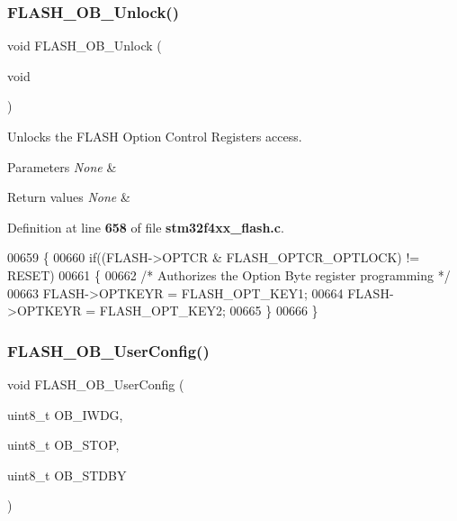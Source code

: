 \subsubsection{F\+L\+A\+S\+H\+\_\+\+O\+B\+\_\+\+Unlock()}
{\footnotesize\ttfamily void F\+L\+A\+S\+H\+\_\+\+O\+B\+\_\+\+Unlock (\begin{DoxyParamCaption}\item[{void}]{ }\end{DoxyParamCaption})}



Unlocks the F\+L\+A\+SH Option Control Registers access. 


\begin{DoxyParams}{Parameters}
{\em None} & \\
\hline
\end{DoxyParams}

\begin{DoxyRetVals}{Return values}
{\em None} & \\
\hline
\end{DoxyRetVals}


Definition at line \textbf{ 658} of file \textbf{ stm32f4xx\+\_\+flash.\+c}.


\begin{DoxyCode}
00659 \{
00660   \textcolor{keywordflow}{if}((FLASH->OPTCR & FLASH_OPTCR_OPTLOCK) != RESET)
00661   \{
00662     \textcolor{comment}{/* Authorizes the Option Byte register programming */}
00663     FLASH->OPTKEYR = FLASH_OPT_KEY1;
00664     FLASH->OPTKEYR = FLASH_OPT_KEY2;
00665   \}  
00666 \}
\end{DoxyCode}
\mbox{\label{group__FLASH__Group3_ga6b605409e4271b4cc6dfb56ed8108a1a}} 
\subsubsection{F\+L\+A\+S\+H\+\_\+\+O\+B\+\_\+\+User\+Config()}
{\footnotesize\ttfamily void F\+L\+A\+S\+H\+\_\+\+O\+B\+\_\+\+User\+Config (\begin{DoxyParamCaption}\item[{uint8\+\_\+t}]{O\+B\+\_\+\+I\+W\+DG,  }\item[{uint8\+\_\+t}]{O\+B\+\_\+\+S\+T\+OP,  }\item[{uint8\+\_\+t}]{O\+B\+\_\+\+S\+T\+D\+BY }\end{DoxyParamCaption})}



